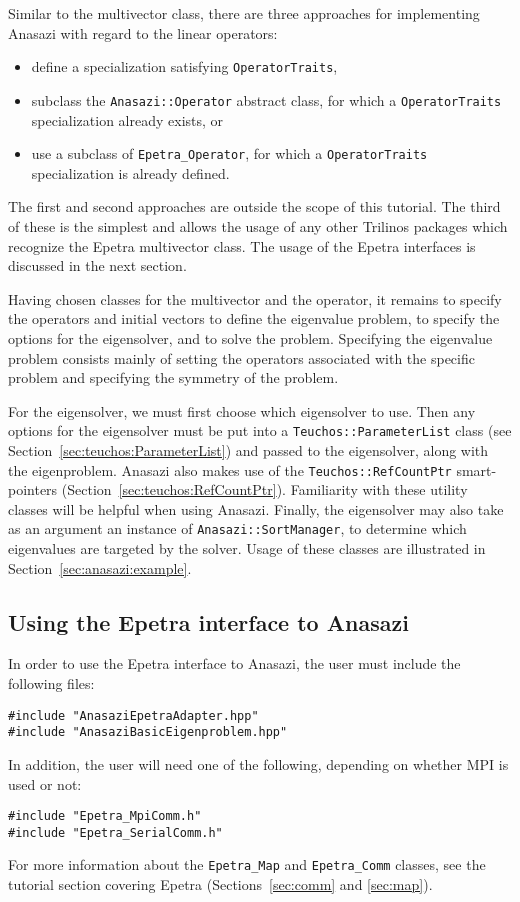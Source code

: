 Similar to the multivector class, there are three approaches for
implementing Anasazi with regard to the linear operators:
\begin{itemize}
\item define a specialization satisfying \verb!OperatorTraits!,
\item subclass the \verb!Anasazi::Operator! abstract class, for which a
\verb!OperatorTraits! specialization already exists, or
\item use a subclass of \verb!Epetra_Operator!, 
for which a \verb!OperatorTraits! specialization is already defined.
\end{itemize}

The first and second approaches are outside the scope of this
tutorial. The third of these is the simplest and allows the usage of
any other Trilinos packages which recognize the Epetra multivector
class. The usage of the Epetra interfaces is discussed in the next
section.

Having chosen classes for the multivector and the operator, it remains
to specify the operators and initial vectors to define the eigenvalue
problem, to specify the options for the eigensolver, and to solve the
problem. Specifying the eigenvalue problem consists mainly of setting
the operators associated with the specific problem and specifying the
symmetry of the problem. 

For the eigensolver, we must first choose which eigensolver to use.  Then any
options for the eigensolver must be put into a \verb!Teuchos::ParameterList!
class (see Section~\ref{sec:teuchos:ParameterList}) and passed to the
eigensolver, along with the eigenproblem. Anasazi also makes use of the
\verb!Teuchos::RefCountPtr! smart-pointers
(Section~\ref{sec:teuchos:RefCountPtr}). Familiarity with these utility classes
will be helpful when using Anasazi. Finally, the eigensolver may also take as
an argument an instance of \verb!Anasazi::SortManager!, to determine which
eigenvalues are targeted by the solver. Usage of these classes are illustrated
in Section~\ref{sec:anasazi:example}.


\subsection{Using the Epetra interface to Anasazi}
\label{sec:anasazi:interface}

In order to use the Epetra interface to Anasazi, the user must include
the following files:
\begin{verbatim}
#include "AnasaziEpetraAdapter.hpp"
#include "AnasaziBasicEigenproblem.hpp"
\end{verbatim}
In addition, the user will need one of the following, depending on
whether MPI is used or not:
\begin{verbatim}
#include "Epetra_MpiComm.h"
#include "Epetra_SerialComm.h"
\end{verbatim}
For more information about the \verb!Epetra_Map! and \verb!Epetra_Comm!
classes, see the tutorial section covering Epetra (Sections~\ref{sec:comm} and
\ref{sec:map}).

